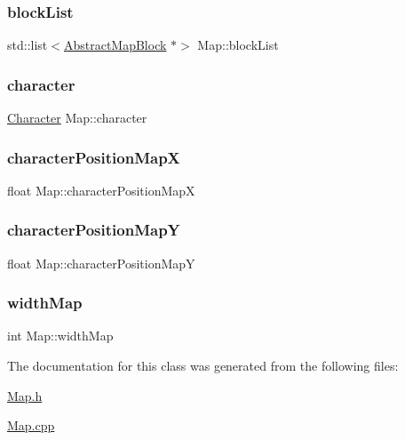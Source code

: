 \mbox{\label{class_map_ad185fe5369037999533e218f3f7ade8a}} 
\subsubsection{\texorpdfstring{block\+List}{blockList}}
{\footnotesize\ttfamily std\+::list$<$\hyperlink{class_abstract_map_block}{Abstract\+Map\+Block} $\ast$$>$ Map\+::block\+List}

\mbox{\label{class_map_a00d7fac6e87f2ac95d0182bbb22fdac4}} 
\subsubsection{\texorpdfstring{character}{character}}
{\footnotesize\ttfamily \hyperlink{class_character}{Character} Map\+::character}

\mbox{\label{class_map_acfd2fda55638ba32a092fac314f9f1c5}} 
\subsubsection{\texorpdfstring{character\+Position\+MapX}{characterPositionMapX}}
{\footnotesize\ttfamily float Map\+::character\+Position\+MapX}

\mbox{\label{class_map_aa4e4d68c7babc74782b973a3b97431ea}} 
\subsubsection{\texorpdfstring{character\+Position\+MapY}{characterPositionMapY}}
{\footnotesize\ttfamily float Map\+::character\+Position\+MapY}

\mbox{\label{class_map_ac62ec077cb012a9fe7d987b466a48947}} 
\subsubsection{\texorpdfstring{width\+Map}{widthMap}}
{\footnotesize\ttfamily int Map\+::width\+Map}



The documentation for this class was generated from the following files\+:\begin{DoxyCompactItemize}
\item 
\hyperlink{_map_8h}{Map.\+h}\item 
\hyperlink{_map_8cpp}{Map.\+cpp}\end{DoxyCompactItemize}
